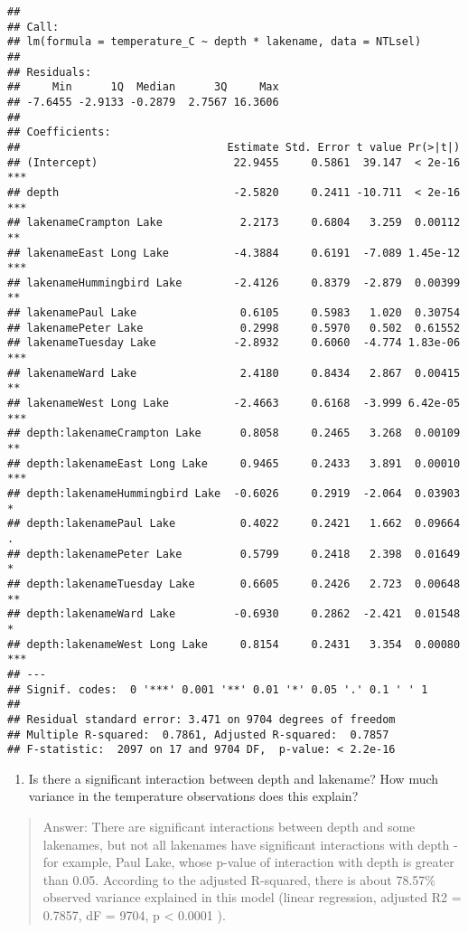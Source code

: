 \documentclass[]{article}
\providecommand{\tightlist}{%
  \setlength{\itemsep}{0pt}\setlength{\parskip}{0pt}}
\begin{document}
\begin{verbatim}
## 
## Call:
## lm(formula = temperature_C ~ depth * lakename, data = NTLsel)
## 
## Residuals:
##     Min      1Q  Median      3Q     Max 
## -7.6455 -2.9133 -0.2879  2.7567 16.3606 
## 
## Coefficients:
##                                Estimate Std. Error t value Pr(>|t|)    
## (Intercept)                     22.9455     0.5861  39.147  < 2e-16 ***
## depth                           -2.5820     0.2411 -10.711  < 2e-16 ***
## lakenameCrampton Lake            2.2173     0.6804   3.259  0.00112 ** 
## lakenameEast Long Lake          -4.3884     0.6191  -7.089 1.45e-12 ***
## lakenameHummingbird Lake        -2.4126     0.8379  -2.879  0.00399 ** 
## lakenamePaul Lake                0.6105     0.5983   1.020  0.30754    
## lakenamePeter Lake               0.2998     0.5970   0.502  0.61552    
## lakenameTuesday Lake            -2.8932     0.6060  -4.774 1.83e-06 ***
## lakenameWard Lake                2.4180     0.8434   2.867  0.00415 ** 
## lakenameWest Long Lake          -2.4663     0.6168  -3.999 6.42e-05 ***
## depth:lakenameCrampton Lake      0.8058     0.2465   3.268  0.00109 ** 
## depth:lakenameEast Long Lake     0.9465     0.2433   3.891  0.00010 ***
## depth:lakenameHummingbird Lake  -0.6026     0.2919  -2.064  0.03903 *  
## depth:lakenamePaul Lake          0.4022     0.2421   1.662  0.09664 .  
## depth:lakenamePeter Lake         0.5799     0.2418   2.398  0.01649 *  
## depth:lakenameTuesday Lake       0.6605     0.2426   2.723  0.00648 ** 
## depth:lakenameWard Lake         -0.6930     0.2862  -2.421  0.01548 *  
## depth:lakenameWest Long Lake     0.8154     0.2431   3.354  0.00080 ***
## ---
## Signif. codes:  0 '***' 0.001 '**' 0.01 '*' 0.05 '.' 0.1 ' ' 1
## 
## Residual standard error: 3.471 on 9704 degrees of freedom
## Multiple R-squared:  0.7861, Adjusted R-squared:  0.7857 
## F-statistic:  2097 on 17 and 9704 DF,  p-value: < 2.2e-16
\end{verbatim}

\begin{enumerate}
\def\labelenumi{\arabic{enumi}.}
\setcounter{enumi}{6}
\tightlist
\item
  Is there a significant interaction between depth and lakename? How
  much variance in the temperature observations does this explain?
\end{enumerate}

\begin{quote}
Answer: There are significant interactions between depth and some
lakenames, but not all lakenames have significant interactions with
depth - for example, Paul Lake, whose p-value of interaction with depth
is greater than 0.05. According to the adjusted R-squared, there is
about 78.57\% observed variance explained in this model (linear
regression, adjusted R2 = 0.7857, dF = 9704, p \textless{} 0.0001 ).
\end{quote}
\end{document}
